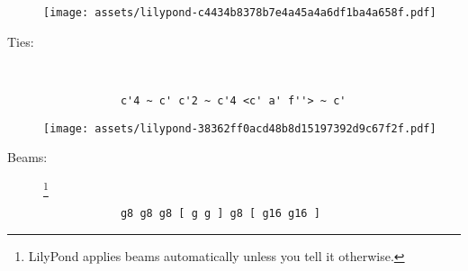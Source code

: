 \documentclass[a4paper]{tufte-handout}
\newenvironment{abjadbookoutput}{}{}
\begin{document}
\begin{description}
\begin{multicols}{2}
            \begin{comment}
            <lilypond>[stylesheet=stylesheet-minimal.ily]
            { r2 r4 r4.. r16 s4 r4 }
            </lilypond>
            \end{comment}

            \begin{abjadbookoutput}
            \noindent\texttt{[image: assets/lilypond-c4434b8378b7e4a45a4a6df1ba4a658f.pdf]}
            \end{abjadbookoutput}

        \end{multicols}

    \item[Ties:]
        \hfill \vspace{-\baselineskip} \\
        \begin{multicols}{2}

            \begin{verbatim}
            c'4 ~ c' c'2 ~ c'4 <c' a' f''> ~ c'
            \end{verbatim}

            \begin{comment}
            <lilypond>[stylesheet=stylesheet-minimal.ily]
            { c'4 ~ c' c'2 ~ c'4 <c' a' f''> ~ c' }
            </lilypond>
            \end{comment}

            \begin{abjadbookoutput}
            \noindent\texttt{[image: assets/lilypond-38362ff0acd48b8d15197392d9c67f2f.pdf]}
            \end{abjadbookoutput}

        \end{multicols}

    \item[Beams:]\footnote{%
        LilyPond applies beams automatically unless you tell it otherwise.}
        \hfill \vspace{-\baselineskip} \\
        \begin{multicols}{2}

            \begin{verbatim}
            g8 g8 g8 [ g g ] g8 [ g16 g16 ]
            \end{verbatim}

            \begin{comment}
            <lilypond>[stylesheet=stylesheet-minimal.ily]
            { g8 [ g8 ] g8 [ g g ] g8 [ g16 g16 ] }
            </lilypond>
            \end{comment}


\end{multicols}
\end{description}
\end{document}
